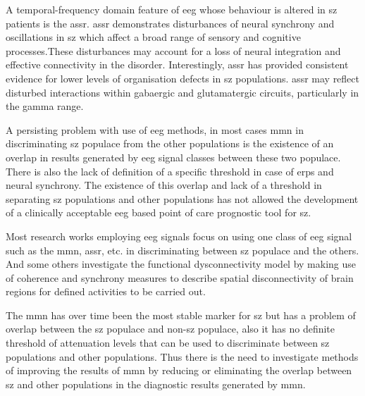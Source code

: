 A temporal-frequency domain feature of \ac{eeg} whose behaviour is altered in \ac{sz} patients is the \ac{assr}. \ac{assr} demonstrates disturbances of neural synchrony and oscillations in \ac{sz} which affect a broad range of sensory and cognitive processes.These disturbances may account for a loss of neural integration and effective connectivity in the disorder. Interestingly, \ac{assr} has provided consistent evidence for lower levels of organisation defects in \ac{sz} populations. \ac{assr} may reflect disturbed interactions within \ac{gaba}ergic and glutamatergic circuits, particularly in the gamma range.

A persisting problem with use of \ac{eeg} methods, in most cases \ac{mmn} in discriminating \ac{sz} populace from the other populations is the existence of an overlap in results generated by \ac{eeg} signal classes between these two populace. There is also the lack of definition of a specific threshold in case of \ac{erp}s and neural synchrony. The existence of this overlap and lack of a threshold in separating \ac{sz} populations and other populations has not allowed the development of a clinically acceptable \ac{eeg} based point of care prognostic tool for \ac{sz}.

Most research works employing \ac{eeg} signals focus on using one class of \ac{eeg} signal such as the \ac{mmn}, \ac{assr}, etc. in discriminating between \ac{sz} populace and the others. And some others investigate the  functional dysconnectivity model by making use of coherence and synchrony measures to describe spatial disconnectivity of brain regions for defined activities to be carried out. 

The \ac{mmn} has over time been the most stable marker for \ac{sz} but has a problem of overlap between the \ac{sz} populace and non-\ac{sz} populace, also it has no definite threshold of attenuation levels that can be used to discriminate between \ac{sz} populations and other populations. Thus there is the need to investigate methods of improving the results of \ac{mmn} by reducing or eliminating the overlap between \ac{sz} and other populations in the diagnostic results generated by \ac{mmn}.


